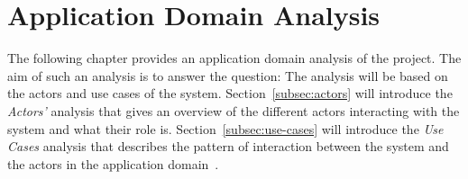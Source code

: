 \section{Application Domain Analysis}\label{sec:application-domain-analysis}

The following chapter provides an application domain analysis of the project.
The aim of such an analysis is to answer the question:
The analysis will be based on the actors and use cases of the system.
Section~\ref{subsec:actors} will introduce the \textit{Actors'} analysis that gives an overview of the different actors
interacting with the system and what their role is.
Section~\ref{subsec:use-cases} will introduce the \textit{Use Cases} analysis that describes the pattern of interaction
between the system and the actors in the application domain~\cite{mathiassen2018}.




